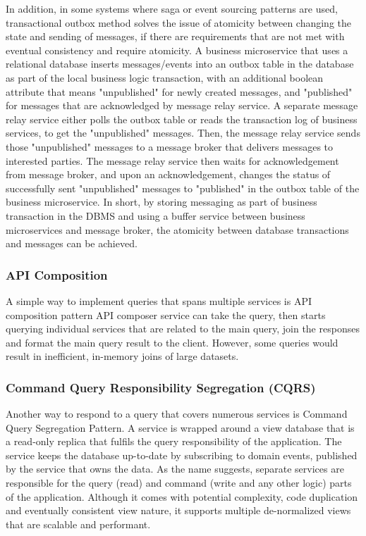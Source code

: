 \documentclass{Configuration_Files/PoliMi3i_thesis}
\begin{document}
In addition, in some systems where saga or event sourcing patterns are used, transactional outbox method solves the issue of atomicity between changing the state and sending of messages, if there are requirements that are not met with eventual consistency and require atomicity.
A business microservice that uses a relational database inserts messages/events into an outbox table in the database as part of the local business logic transaction, with an additional boolean attribute that means "unpublished" for newly created messages, and "published" for messages that are acknowledged by message relay service.
A separate message relay service either polls the outbox table or reads the transaction log of business services, to get the "unpublished" messages.
Then, the message relay service sends those "unpublished" messages to a message broker that delivers messages to interested parties.
The message relay service then waits for acknowledgement from message broker, and upon an acknowledgement, changes the status of successfully sent "unpublished" messages to "published" in the outbox table of the business microservice.
In short, by storing messaging as part of business transaction in the DBMS and using a buffer service between business microservices and message broker, the atomicity between database transactions and messages can be achieved.

\subsubsection{API Composition}
\label{subsubsec:api_comp}

A simple way to implement queries that spans multiple services is API composition pattern
API composer service can take the query, then starts querying individual services that are related to the main query, join the responses and format the main query result to the client.
However, some queries would result in inefficient, in-memory joins of large datasets.

\subsubsection{Command Query Responsibility Segregation (CQRS)}
\label{subsubsec:cqrs}

Another way to respond to a query that covers numerous services is Command Query Segregation Pattern.
A service is wrapped around a view database that is a read-only replica that fulfils the query responsibility of the application.
The service keeps the database up-to-date by subscribing to domain events, published by the service that owns the data.
As the name suggests, separate services are responsible for the query (read) and command (write and any other logic) parts of the application.
Although it comes with potential complexity, code duplication and eventually consistent view nature, it supports multiple de-normalized views that are scalable and performant.
\end{document}
